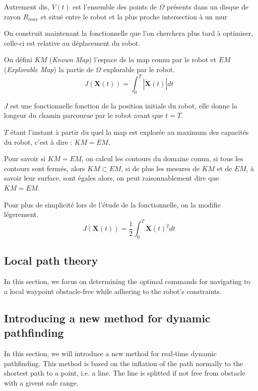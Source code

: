 \documentclass[../main.tex]{subfiles}
\begin{document}
Autrement dis, $V(t)$ est l'ensemble des points de $\Omega$ présents dans un disque de rayon $R_{max}$ et situé entre le robot et la plus proche intersection à un mur 

On construit maintenant la fonctionnelle que l'on cherchera plus tard à optimiser, celle-ci est relative au déplacement du robot.


On défini $\mathit{KM}$ (\textit{Known Map}) l'espace de la map connu par le robot et $\mathit{EM}$ (\textit{Explorable Map}) la partie de $\Omega$ explorable par le robot.
\begin{equation}
    \displaystyle
    J(\mathbf{X}(t)) = \int_{0}^{T} | \mathbf{\dot{X}}(t) | dt
\end{equation}

$J$ est une fonctionnelle fonction de la position initiale du robot, elle donne la longeur du chamin parcourue par le robot avant que $t = T$.

$T$ étant l'instant à partir du quel la map est explorée au maximum des capacités du robot, c'est à dire : $KM = EM$.

Pour savoir si $KM = EM$, on calcul les contours du domaine connu, si tous les contours sont fermés, alors $KM \subset EM$, si de plus les mesures de $KM$ et de $EM$, à savoir leur surface, sont égales alors, on peut raisonnablement dire que $KM = EM$.


Pour plus de simplicité lors de l'étude de la fonctionnelle, on la modifie légerement.
\begin{equation}
    \displaystyle
    J(\mathbf{X}(t)) = \frac{1}{2} \int_{0}^{T} \mathbf{\dot{X}}(t)^{2} dt
\end{equation}

\subsection{Local path theory}

In this section, we focus on determining the optimal commands for navigating to a local waypoint obstacle-free while adhering to the robot's constraints.






\subsection{Introducing a new method for dynamic pathfinding}

In this section, we will introduce a new method for real-time dynamic pathfinding. This method is based on the inflation of the path normally to the shortest path to a point, i.e. a line. The line is splitted if not free from obstacle with a givent safe range. 
\end{document}
